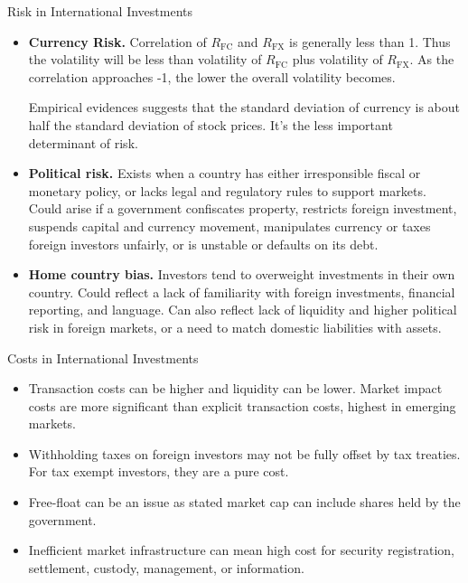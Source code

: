 \documentclass[../custom]{flashcards}
\newcommand{\studyArea}{Asset Allocation}
\begin{document}
\begin{flashcard}[\studyArea]{Risk in International Investments}
    \begin{itemize}
        \item \textbf{Currency Risk.} Correlation of $R_{\text{FC}}$ and $R_{\text{FX}}$ is generally less than 1. Thus the volatility will be less than volatility of $R_{\text{FC}}$ plus volatility of $R_{\text{FX}}$. As the correlation approaches -1, the lower the overall volatility becomes.

            Empirical evidences suggests that the standard deviation of currency is about half the standard deviation of stock prices. It's the less important determinant of risk.
        \item \textbf{Political risk.} Exists when a country has either irresponsible fiscal or monetary policy, or lacks legal and regulatory rules to support markets. Could arise if a government confiscates property, restricts foreign investment, suspends capital and currency movement, manipulates currency or taxes foreign investors unfairly, or is unstable or defaults on its debt.
        \item \textbf{Home country bias.} Investors tend to overweight investments in their own country. Could reflect a lack of familiarity with foreign investments, financial reporting, and language. Can also reflect lack of liquidity and higher political risk in foreign markets, or a need to match domestic liabilities with assets.
    \end{itemize}
\end{flashcard}

\begin{flashcard}[\studyArea]{Costs in International Investments}
    \begin{itemize}
        \item Transaction costs can be higher and liquidity can be lower. Market impact costs are more significant than explicit transaction costs, highest in emerging markets.
        \item Withholding taxes on foreign investors may not be fully offset by tax treaties. For tax exempt investors, they are a pure cost.
        \item Free-float can be an issue as stated market cap can include shares held by the government.
        \item Inefficient market infrastructure can mean high cost for security registration, settlement, custody, management, or information.
    \end{itemize}
\end{flashcard}
\end{document}
